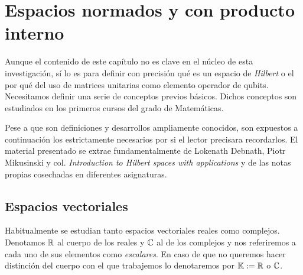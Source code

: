 \chapter{Espacios normados y con producto interno}
\label{chapter2}

Aunque el contenido de este capítulo no es clave en el núcleo de esta investigación, sí lo es para definir con precisión qué es un espacio de \textit{Hilbert} o el por qué del uso de matrices unitarias como elemento operador de qubits. Necesitamos definir una serie de conceptos previos básicos. Dichos conceptos son estudiados en los primeros cursos del grado de Matemáticas.

Pese a que son definiciones y desarrollos ampliamente conocidos, son expuestos a continuación los estrictamente necesarios por si el lector precisara recordarlos. El material presentado se extrae fundamentalmente de Lokenath Debnath, Piotr Mikusinski y col. \textit{Introduction to Hilbert spaces with applications} y de las notas propias cosechadas en diferentes asignaturas.

\section{Espacios vectoriales}

Habitualmente se estudian tanto espacios vectoriales reales como complejos. Denotamos $\mathbb{R}$ al cuerpo de los reales y $\mathbb{C}$ al de los complejos y nos referiremos a cada uno de sus elementos como \textit{escalares}. En caso de que no queremos hacer distinción del cuerpo con el que trabajemos lo denotaremos por $\mathbb{K}:=\mathbb{R}$ o $\mathbb{C}$.


